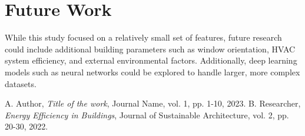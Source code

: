 \documentclass[12pt]{article}
\begin{document}
\section{Future Work}
While this study focused on a relatively small set of features, future research could include additional building parameters such as window orientation, HVAC system efficiency, and external environmental factors. Additionally, deep learning models such as neural networks could be explored to handle larger, more complex datasets.

\begin{thebibliography}{9}
 A. Author, \emph{Title of the work}, Journal Name, vol. 1, pp. 1-10, 2023.
 B. Researcher, \emph{Energy Efficiency in Buildings}, Journal of Sustainable Architecture, vol. 2, pp. 20-30, 2022.
\end{thebibliography}
\end{document}
